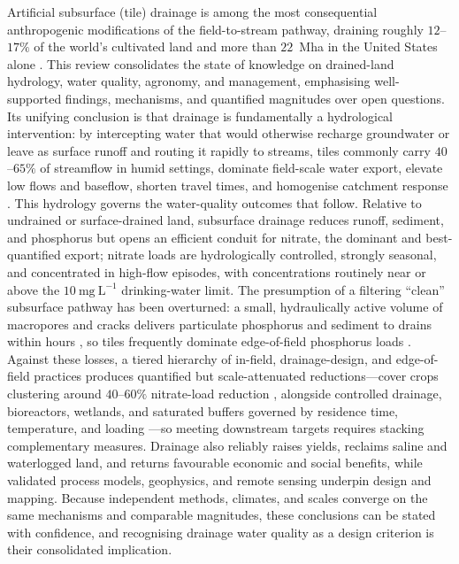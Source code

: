 Artificial subsurface (tile) drainage is among the most consequential
anthropogenic modifications of the field-to-stream pathway, draining roughly
$12$--$17\%$ of the world's cultivated land and more than $22$~Mha in the
United States alone \parencite{Valipour2014,Valayamkunnath2020}. This review consolidates the state of knowledge on
drained-land hydrology, water quality, agronomy, and management, emphasising
well-supported findings, mechanisms, and quantified magnitudes over open
questions. Its unifying conclusion is that drainage is fundamentally a
hydrological intervention: by intercepting water that would otherwise recharge
groundwater or leave as surface runoff and routing it rapidly to streams, tiles
commonly carry $40$--$65\%$ of streamflow in humid settings, dominate field-scale
water export, elevate low flows and baseflow, shorten travel times, and
homogenise catchment response \parencite{King2014,Schilling2019}. This hydrology governs the water-quality
outcomes that follow. Relative to undrained or surface-drained land, subsurface
drainage reduces runoff, sediment, and phosphorus but opens an efficient conduit
for nitrate, the dominant and best-quantified export; nitrate loads are
hydrologically controlled, strongly seasonal, and concentrated in high-flow
episodes, with concentrations routinely near or above the $10~\mathrm{mg~L^{-1}}$
drinking-water limit. The presumption of a filtering ``clean'' subsurface pathway
has been overturned: a small, hydraulically active volume of macropores and
cracks delivers particulate phosphorus and sediment to drains within hours \parencite{Pease2018}, so
tiles frequently dominate edge-of-field phosphorus loads \parencite{Pease2018,Sharpley1995}. Against these losses,
a tiered hierarchy of in-field, drainage-design, and edge-of-field practices
produces quantified but scale-attenuated reductions---cover crops clustering
around $40$--$60\%$ nitrate-load reduction \parencite{Malone2018,Malone2014b,Malone2023}, alongside controlled drainage,
bioreactors, wetlands, and saturated buffers governed by residence time,
temperature, and loading \parencite{Christianson2013,Jaynes2008}---so meeting downstream targets requires stacking
complementary measures. Drainage also reliably raises yields, reclaims saline
and waterlogged land, and returns favourable economic and social benefits, while
validated process models, geophysics, and remote sensing underpin design and
mapping. Because independent methods, climates, and scales converge on the same
mechanisms and comparable magnitudes, these conclusions can be stated with
confidence, and recognising drainage water quality as a design criterion is
their consolidated implication.